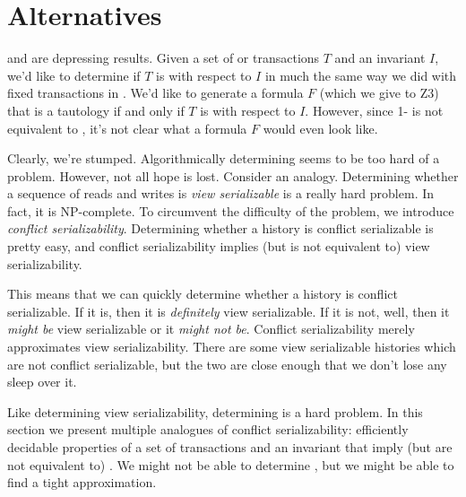 \section{\iconfluence{} Alternatives}
\begin{todoitemize}
  \item {}
  \item {}
  \item {}
  \item {}
  \item {}
\end{todoitemize}

 and  are depressing
results. Given a set of \imp{} or \wimp{} transactions $T$ and an invariant
$I$, we'd like to determine if $T$ is \iconfluent{} with respect to $I$ in much
the same way we did with fixed transactions in . We'd like to
generate a formula $F$ (which we give to Z3) that is a tautology if and only if
$T$ is \iconfluent{} with respect to $I$. However, since 1-\iconfluence{} is
not equivalent to \iconfluence{}, it's not clear what a formula $F$ would even
look like.

Clearly, we're stumped. Algorithmically determining \iconfluence{} seems to be
too hard of a problem. However, not all hope is lost. Consider an analogy.
Determining whether a sequence of reads and writes is \emph{view serializable}
is a really hard problem. In fact, it is NP-complete. To circumvent the
difficulty of the problem, we introduce \emph{conflict serializability}.
Determining whether a history is conflict serializable is pretty easy, and
conflict serializability implies (but is not equivalent to) view
serializability.

This means that we can quickly determine whether a history is conflict
serializable. If it is, then it is \emph{definitely} view serializable. If it
is not, well, then it \emph{might be} view serializable or it \emph{might not
be}. Conflict serializability merely approximates view serializability. There
are some view serializable histories which are not conflict serializable, but
the two are close enough that we don't lose any sleep over it.

Like determining view serializability, determining \iconfluence{} is a hard
problem. In this section we present multiple analogues of conflict
serializability: efficiently decidable properties of a set of transactions and
an invariant that imply (but are not equivalent to) \iconfluence{}. We might
not be able to determine \iconfluence{}, but we might be able to find a tight
approximation.

